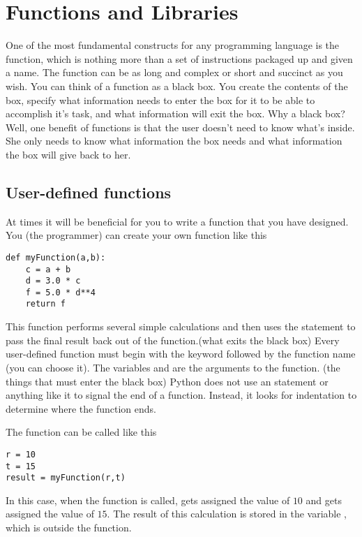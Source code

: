 \chapter{Functions and Libraries}
\label{chap:Functions}

One of the most fundamental constructs for any programming language is
the function, which is nothing more than a set of instructions
packaged up and given a name.  The function can be as long and complex
or short and succinct as you wish.  You can think of a function as a
black box. You create the contents of the box, specify what
information needs to enter the box for it to be able to accomplish
it's task, and what information will exit the box.  Why a black box?
Well, one benefit of functions is that the user doesn't need to
know what's inside.  She only needs to know what information the box
needs and what information the box will give back to her.

\section{User-defined functions}
At times it will be beneficial for you to write a function that you
have designed.  You (the programmer) can create your own function like
this
\begin{Verbatim}
def myFunction(a,b):
    c = a + b
    d = 3.0 * c
    f = 5.0 * d**4
    return f
\end{Verbatim}
This function performs several simple calculations and then uses the
 statement to pass the final result back out of the
function.(what exits the black box) Every user-defined function must
begin with the keyword  followed by the function name (you
can choose it). The variables  and  are the
arguments to the function. (the things that must enter the black box)
Python does not use an  statement or anything like it to
signal the end of a function.  Instead, it looks for indentation to
determine where the function ends.

The function can be called like this
\begin{Verbatim}
r = 10
t = 15
result = myFunction(r,t)
\end{Verbatim}
In this case, when the function is called,  gets assigned
the value of $10$ and  gets assigned the value of $15$.  The
result of this calculation is stored in the variable ,
which is outside the function.

